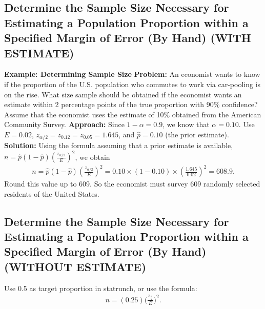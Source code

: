 \documentclass{report}
\begin{document}
   \subsection*{Determine the Sample Size Necessary for Estimating a Population Proportion within a Specified Margin of Error (By Hand) (WITH ESTIMATE)}
   \bigbreak \noindent 
        \begin{mdframed}
       \textbf{Example: Determining Sample Size}
       \bigbreak \noindent 
       \textbf{Problem:}
       An economist wants to know if the proportion of the U.S. population who commutes to work via car-pooling is on the rise. What size sample should be obtained if the economist wants an estimate within 2 percentage points of the true proportion with 90\% confidence?
       \bigbreak \noindent 
       Assume that the economist uses the estimate of 10\% obtained from the American Community Survey.
       \bigbreak \noindent 
       \textbf{Approach:}
       Since \(1 - \alpha = 0.9\), we know that \(\alpha = 0.10\). Use \(E = 0.02\), \(z_{\alpha/2} = z_{0.12} = z_{0.05} = 1.645\), and \(\hat{p} = 0.10\) (the prior estimate).
       \bigbreak \noindent 
       \textbf{Solution:}
       Using the formula assuming that a prior estimate is available, \(n = \hat{p}(1 - \hat{p})\left(\frac{z_{\alpha/2}}{E}\right)^2\), we obtain
       \begin{align*}
           n = \hat{p}(1 - \hat{p})\left(\frac{z_{\alpha/2}}{E}\right)^2 = 0.10 \times (1 - 0.10) \times \left(\frac{1.645}{0.02}\right)^2 = 608.9 
       .\end{align*}
       Round this value up to 609. So the economist must survey 609 randomly selected residents of the United States.
     \end{mdframed}

        \bigbreak \noindent \bigbreak \noindent 
   \subsection*{Determine the Sample Size Necessary for Estimating a Population Proportion within a Specified Margin of Error (By Hand) (WITHOUT ESTIMATE)}
   \bigbreak \noindent 
   Use 0.5 as target proportion in statrunch, or use the formula:
   \begin{align*}
     n = (0.25)\bigg(\frac{z_{\frac{\alpha}{2}}}{E}\bigg)^{2}
   .\end{align*}
\end{document}
